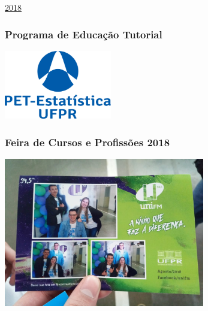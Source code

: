 \documentclass[10pt,
  aspectratio=169,
  serif,
  mathserif,
  professionalfont,
  compress,
  handout,
  ]{beamer}\usepackage[]{graphicx}\usepackage[]{color}
\begin{document}
\begin{frame}[c, allowframebreaks]

\begin{center}

  {\huge \href{https://lineu96.github.io/st/}{2018}}
  
\end{center}

\end{frame}


\begin{frame}

\frametitle{Programa de Educação Tutorial}

\begin{center}
  \includegraphics[height=3cm]{img/pet.png}
\end{center}

\end{frame}


\begin{frame}

\frametitle{Feira de Cursos e Profissões 2018}

\begin{center}
  \includegraphics[height=6.5cm]{img/feira5.jpg}
\end{center}

\end{frame}
\end{document}
